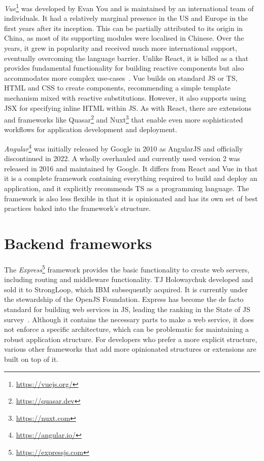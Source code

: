 \emph{Vue}\footnote{\url{https://vuejs.org/}} was developed by Evan You and is maintained by an international team of individuals.
It had a relatively marginal presence in the US and Europe in the first years after its inception.
This can be partially attributed to its origin in China, as most of its supporting modules were localised in Chinese.
Over the years, it grew in popularity and received much more international support, eventually overcoming the language barrier.
Unlike React, it is billed as a  that provides fundamental functionality for building reactive components but also accommodates more complex use-cases~\parencite{vueProgressiveFramework}.
Vue builds on standard \ac{JS} or \ac{TS}, \ac{HTML} and \ac{CSS} to create components, recommending a simple template mechanism mixed with reactive substitutions.
However, it also supports using \ac{JSX} for specifying inline \ac{HTML} within \ac{JS}.
As with React, there are extensions and frameworks like Quasar\footnote{\url{https://quasar.dev}} and Nuxt\footnote{\url{https://nuxt.com}} that enable even more sophisticated workflows for application development and deployment.

\emph{Angular}\footnote{\url{https://angular.io/}} was initially released by Google in 2010 as AngularJS and officially discontinued in 2022.
A wholly overhauled and currently used version 2 was released in 2016 and maintained by Google.
It differs from React and Vue in that it is a complete framework containing everything required to build and deploy an application, and it explicitly recommends \ac{TS} as a programming language.
The framework is also less flexible in that it is opinionated and has its own set of best practices baked into the framework's structure.

\section{Backend frameworks}
\label{sec:backend-frameworks}

The \emph{Express}\footnote{\url{https://expressjs.com}} framework provides the basic functionality to create web servers, including routing and middleware functionality.
TJ Holowaychuk developed and sold it to StrongLoop, which IBM subsequently acquired.
It is currently under the stewardship of the OpenJS Foundation.
Express has become the de facto standard for building web services in JS, leading the ranking in the State of JS survey~\parencite{mostUsedBackendFrameworks22}.
Although it contains the necessary parts to make a web service, it does not enforce a specific architecture, which can be problematic for maintaining a robust application structure.
For developers who prefer a more explicit structure, various other frameworks that add more opinionated structures or extensions are built on top of it.

